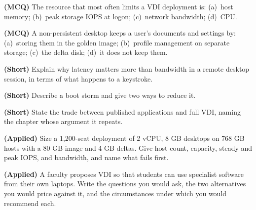 \begin{reviewq}
  \item \textbf{(MCQ)} The resource that most often limits a VDI deployment
        is: (a)~host memory; (b)~peak storage IOPS at logon; (c)~network
        bandwidth; (d)~CPU.
  \item \textbf{(MCQ)} A non-persistent desktop keeps a user's documents and
        settings by: (a)~storing them in the golden image; (b)~profile
        management on separate storage; (c)~the delta disk; (d)~it does not
        keep them.
  \item \textbf{(Short)} Explain why latency matters more than bandwidth in a
        remote desktop session, in terms of what happens to a keystroke.
  \item \textbf{(Short)} Describe a boot storm and give two ways to reduce it.
  \item \textbf{(Short)} State the trade between published applications and
        full VDI, naming the chapter whose argument it repeats.
  \item \textbf{(Applied)} Size a 1{,}200-seat deployment of 2 vCPU, 8 GB
        desktops on 768 GB hosts with a 80 GB image and 4 GB deltas. Give host
        count, capacity, steady and peak IOPS, and bandwidth, and name what
        fails first.
  \item \textbf{(Applied)} A faculty proposes VDI so that students can use
        specialist software from their own laptops. Write the questions you
        would ask, the two alternatives you would price against it, and the
        circumstances under which you would recommend each.
\end{reviewq}
